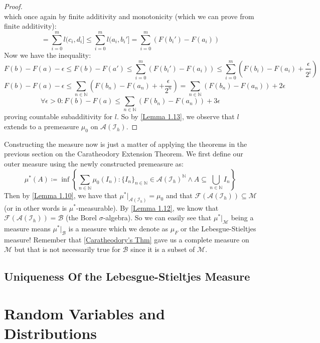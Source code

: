 \documentclass[10pt,letterpaper]{article} %
\begin{document}
\begin{proof}
\begin{equation*}
\end{equation*}
which once again by finite additivity and monotonicity (which we can prove from finite additivity):
\begin{equation*}
= \sum_{i=0}^m l(c_i, d_i] \leqslant \sum_{i=0}^m l(a_i, b_i'] = \sum_{i=0}^m (F(b_i') - F(a_i))
\end{equation*}
Now we have the inequality:
\begin{equation*}
F(b) - F(a) - \epsilon \leqslant F(b) - F(a') \leqslant \sum_{i=0}^m (F(b_i') - F(a_i)) \leqslant \sum_{i=0}^m \left(F(b_i) - F(a_i) + \frac{\epsilon}{2^i}\right)
\end{equation*}
\begin{equation*}
F(b) - F(a) - \epsilon \leqslant \sum_{n \in \mathbb{N}}\left(F(b_n)  - F(a_n) + + \frac{\epsilon}{2^n}\right) = \sum_{n \in \mathbb{N}}(F(b_n) - F(a_n)) + 2\epsilon
\end{equation*}
\begin{equation*}
\forall \epsilon > 0: F(b) - F(a) \leqslant \sum_{n \in \mathbb{N}}(F(b_n) - F(a_n)) + 3\epsilon
\end{equation*}
proving countable subadditivity for $l$. So by \cref{Lemma 1.13}, we observe that $l$ extends to a premeasure $\mu_0$ on $\mathcal{A}(\mathcal{I}_h)$.
\end{proof}
Constructing the measure now is just a matter of applying the theorems in the previous section on the Caratheodory Extension Theorem. We first define our outer measure using the newly constructed premeasure as:
\begin{equation*}
\mu^*(A) \coloneq \inf\left\{\sum_{n \in \mathbb{N}}\mu_0(I_n) : \{I_n\}_{n \in \mathbb{N}} \in \mathcal{A}(\mathcal{I}_h)^\mathbb{N} \land A \subseteq \bigcup_{n \in \mathbb{N}}I_n\right\}
\end{equation*}
Then by \cref{Lemma 1.10}, we have that $\mu^*|_{\mathcal{A}(\mathcal{I}_h)} = \mu_0$ and that $\mathcal{F}(\mathcal{A}(\mathcal{I}_h)) \subseteq \mathcal{M}$ (or in other words is $\mu^*$-measurable). By \cref{Lemma 1.12}, we know that $\mathcal{F}(\mathcal{A}(\mathcal{I}_h)) = \mathcal{B}$ (the Borel $\sigma$-algebra).
So we can easily see that $\mu^*|_\mathcal{M}$ being a measure means $\mu^*|_\mathcal{B}$ is a measure which we denote as $\mu_F$ or the Lebesgue-Stieltjes measure! Remember that \cref{Caratheodory's Thm} gave us a complete measure on $\mathcal{M}$ but that is not necessarily true for $\mathcal{B}$ since it is a subset of $\mathcal{M}$.
\pagebreak

\subsection{Uniqueness Of the Lebesgue-Stieltjes Measure}

\pagebreak
\section{Random Variables and Distributions}
\end{document}

